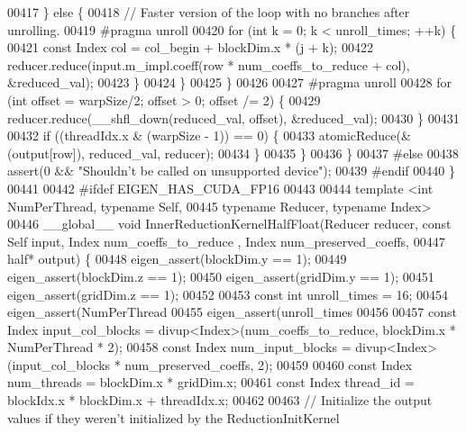 \begin{DoxyCode}
00417         \} \textcolor{keywordflow}{else} \{
00418           \textcolor{comment}{// Faster version of the loop with no branches after unrolling.}
00419 \textcolor{preprocessor}{#pragma unroll}
00420           \textcolor{keywordflow}{for} (\textcolor{keywordtype}{int} k = 0; k < unroll\_times; ++k) \{
00421             \textcolor{keyword}{const} Index col = col\_begin + blockDim.x * (j + k);
00422             reducer.reduce(input.m\_impl.coeff(row * num\_coeffs\_to\_reduce + col), &reduced\_val);
00423           \}
00424         \}
00425       \}
00426 
00427 \textcolor{preprocessor}{#pragma unroll}
00428       \textcolor{keywordflow}{for} (\textcolor{keywordtype}{int} offset = warpSize/2; offset > 0; offset /= 2) \{
00429         reducer.reduce(\_\_shfl\_down(reduced\_val, offset), &reduced\_val);
00430       \}
00431 
00432       \textcolor{keywordflow}{if} ((threadIdx.x & (warpSize - 1)) == 0) \{
00433         atomicReduce(&(output[row]), reduced\_val, reducer);
00434       \}
00435     \}
00436   \}
00437 \textcolor{preprocessor}{#else}
00438   assert(0 && \textcolor{stringliteral}{"Shouldn't be called on unsupported device"});
00439 \textcolor{preprocessor}{#endif}
00440 \}
00441 
00442 \textcolor{preprocessor}{#ifdef EIGEN\_HAS\_CUDA\_FP16}
00443 
00444 \textcolor{keyword}{template} <\textcolor{keywordtype}{int} NumPerThread, \textcolor{keyword}{typename} Self,
00445           \textcolor{keyword}{typename} Reducer, \textcolor{keyword}{typename} Index>
00446 \_\_global\_\_ \textcolor{keywordtype}{void} InnerReductionKernelHalfFloat(Reducer reducer, \textcolor{keyword}{const} Self input, Index num\_coeffs\_to\_reduce
      , Index num\_preserved\_coeffs,
00447                                               half* output) \{
00448   eigen\_assert(blockDim.y == 1);
00449   eigen\_assert(blockDim.z == 1);
00450   eigen\_assert(gridDim.y == 1);
00451   eigen\_assert(gridDim.z == 1);
00452 
00453   \textcolor{keyword}{const} \textcolor{keywordtype}{int} unroll\_times = 16;
00454   eigen\_assert(NumPerThread %
00455   eigen\_assert(unroll\_times %
00456 
00457   \textcolor{keyword}{const} Index input\_col\_blocks = divup<Index>(num\_coeffs\_to\_reduce, blockDim.x * NumPerThread * 2);
00458   \textcolor{keyword}{const} Index num\_input\_blocks = divup<Index>(input\_col\_blocks * num\_preserved\_coeffs, 2);
00459 
00460   \textcolor{keyword}{const} Index num\_threads = blockDim.x * gridDim.x;
00461   \textcolor{keyword}{const} Index thread\_id = blockIdx.x * blockDim.x + threadIdx.x;
00462 
00463   \textcolor{comment}{// Initialize the output values if they weren't initialized by the ReductionInitKernel}

\end{DoxyCode}
